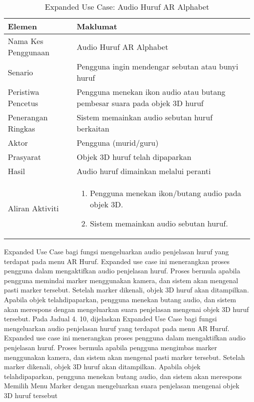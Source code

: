 \begin{itemize}
\begin{itemize}
\begin{itemize}
\begin{itemize}
\begin{itemize}
\begin{itemize}
\begin{itemize}
\begin{itemize}
\begin{table}[htbp]
\centering
\caption{Expanded Use Case: Audio Huruf AR Alphabet}
\begin{tabular}{lp{10cm}}
\toprule
\textbf{Elemen} & \textbf{Maklumat} \\
\midrule
Nama Kes Penggunaan & Audio Huruf AR Alphabet \\
Senario & Pengguna ingin mendengar sebutan atau bunyi huruf \\
Peristiwa Pencetus & Pengguna menekan ikon audio atau butang pembesar suara pada objek 3D huruf \\
Penerangan Ringkas & Sistem memainkan audio sebutan huruf berkaitan \\
Aktor & Pengguna (murid/guru) \\
Prasyarat & Objek 3D huruf telah dipaparkan \\
Hasil & Audio huruf dimainkan melalui peranti \\
Aliran Aktiviti & 
\begin{enumerate}
    \item Pengguna menekan ikon/butang audio pada objek 3D.
    \item Sistem memainkan audio sebutan huruf.
\end{enumerate} \\
\bottomrule
\end{tabular}
\label{jadual:expanded_audio_ar_alphabet}
\end{table}

 Expanded Use Case bagi fungsi mengeluarkan audio penjelasan huruf yang terdapat  pada  menu  AR  Huruf.  Expanded  use  case  ini  menerangkan  proses  pengguna  dalam mengaktifkan         audio          penjelasan          huruf. Proses          bermula          apabila          pengguna memindai  marker  menggunakan  kamera,  dan  sistem  akan  mengenal  pasti  marker tersebut.  Setelah marker dikenali, objek 3D huruf akan ditampilkan. Apabila objek telahdipaparkan, pengguna menekan butang audio, dan sistem akan merespons dengan mengeluarkan suara penjelasan mengenai objek 3D huruf tersebut. Pada  Jadual  4. 10,  dijelaskan  Expanded  Use  Case  bagi  fungsi  mengeluarkan  audio penjelasan huruf yang  terdapat pada  menu AR Huruf.  Expanded use  case  ini  menerangkan proses pengguna    dalam    mengaktifkan    audio     penjelasan    huruf. Proses    bermula    apabila     pengguna mengimbas   marker menggunakan kamera, dan sistem akan mengenal pasti marker tersebut. Setelah marker dikenali, objek 3D huruf akan ditampilkan. Apabila objek telahdipaparkan, pengguna menekan butang  audio,  dan  sistem  akan  merespons  Memilih  Menu  Marker  dengan  mengeluarkan  suara penjelasan mengenai objek 3D huruf tersebut






\end{itemize}
\end{itemize}
\end{itemize}
\end{itemize}
\end{itemize}
\end{itemize}
\end{itemize}
\end{itemize}
